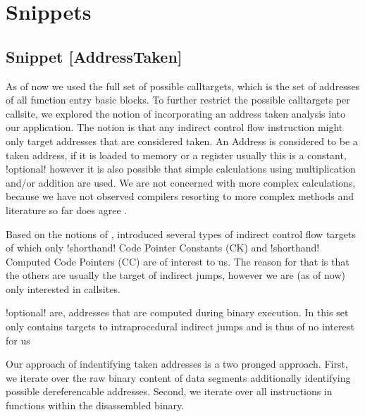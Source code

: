 \part{Snippets} 

\chapter{Snippet [AddressTaken]}

As of now we used the full set of possible calltargets, which is the set of addresses of all function entry basic blocks. To further restrict the possible calltargets per callsite, we explored the notion of incorporating an address taken analysis into our application. The notion is that any indirect control flow instruction might only target addresses that are considered {taken}. An Address is considered to be a {taken} address, if it is loaded to memory or a register usually this is a constant, {!optional! however it is also possible that simple calculations using multiplication and/or addition are used. We are not concerned with more complex calculations, because we have not observed compilers resorting to more complex methods and literature so far does agree \cite{ZhangSekar00}}.

Based on the notions of \cite{ZhangSekar00}, introduced several types of indirect control flow targets of which only {!shorthand! Code Pointer Constants (CK)} and {!shorthand! Computed Code Pointers (CC)} are of interest to us. The reason for that is that the others are usually the target of indirect jumps, however we are (as of now) only interested in callsites.


{!optional!
 { are, addresses that are computed during binary execution. In \cite{ZhangSekar00}  this set only contains targets to intraprocedural indirect jumps and is thus of no interest for us} }

Our approach of indentifying taken addresses is a two pronged approach. First, we iterate over the raw binary content of data segments additionally identifying possible dereferencable addresses. Second, we iterate over all instructions in functions within the disassembled binary.


